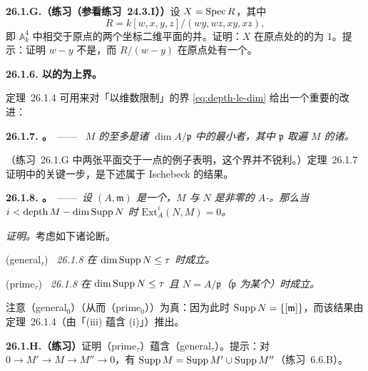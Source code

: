 \textbf{26.1.G.（练习（参看\mbox{练习~24.3.I}））}\quad 设 $X=\operatorname{Spec} R$，其中
\[
R = k[w,x,y,z]/(wy,wz,xy,xz),
\]
即 $\mathbb{A}^4_k$ 中相交于原点的两个坐标二维平面的并。证明：$X$ 在原点处的\trLocalRing{}的\trDepth{}为 $1$。提示：证明 $w-y$ 不是\trZerodivisor，而 $R/(w-y)$ 在原点处有一个\trEmbeddedPoint。

\textbf{26.1.6. \trDepth{}以\trAssociatedPrimeIdeal{}的\trDimension{}为上界。}

\mbox{定理~26.1.4} 可用来对「以维数限制\trDepth」的界 \eqref{eq:depth-le-dim} 给出一个重要的改进：

\textbf{26.1.7. \trhTheorem。}\ ——\ \emph{\trModule{} $M$ 的\trDepth{}至多是诸 $\dim A/\mathfrak{p}$ 中的最小者，其中 $\mathfrak{p}$ 取遍 $M$ 的诸\trAssociatedPrimeIdeal。}

（\mbox{练习~26.1.G} 中两张平面交于一点的例子表明，这个界并不锐利。）\mbox{定理~26.1.7} 证明中的关键一步，是下述属于 Ischebeck 的结果。

\textbf{26.1.8. \trhLemma。}\ ——\ \emph{设 $(A,\mathfrak{m})$ 是一个\trNoetherian\trLocalRing，$M$ 与 $N$ 是非零\trFinitelyGenerated{}的 $A$-\trModule。那么当 $i<\operatorname{depth}M-\dim\operatorname{Supp} N$ 时 $\mathrm{Ext}^i_A(N,M)=0$。}

\emph{证明。}\quad 考虑如下诸论断。

(general$_\tau$) \emph{\mbox{\trhLemma~26.1.8} 在 $\dim\operatorname{Supp} N\le\tau$ 时成立。}

(prime$_\tau$) \emph{\mbox{\trhLemma~26.1.8} 在 $\dim\operatorname{Supp} N\le\tau$ 且 $N=A/\mathfrak{p}$（$\mathfrak{p}$ 为某个\trPrimeIdeal）时成立。}

注意（general$_0$）（从而（prime$_0$））为真：因为此时 $\operatorname{Supp} N=\{[\mathfrak{m}]\}$，而该结果由\mbox{定理~26.1.4}（由「(iii) 蕴含 (i)」）推出。

\textbf{26.1.H.（练习）}\quad 证明（prime$_\tau$）蕴含（general$_\tau$）。提示：对\trShortExactSequence{} $0\to M'\to M\to M''\to 0$，有 $\operatorname{Supp} M=\operatorname{Supp} M'\cup\operatorname{Supp} M''$（\mbox{练习~6.6.B}）。

